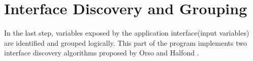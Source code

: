 \section{Interface Discovery and Grouping}

In the last step, variables exposed by the application interface(input variables) are identified and grouped logically. This part of the program implements two interface discovery algorithms proposed by Orso and Halfond \cite{ref2}.



